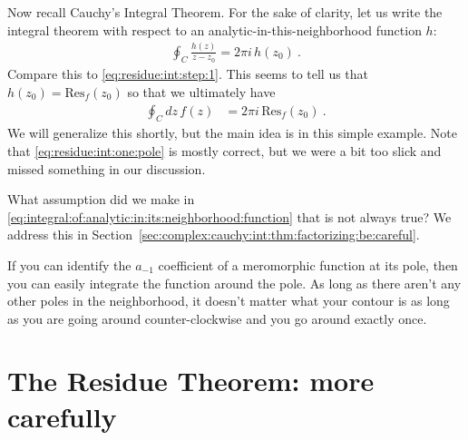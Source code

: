 Now recall Cauchy's Integral Theorem. For the sake of clarity, let us write the integral theorem with respect to an analytic-in-this-neighborhood function $h$:
\begin{align}
  \oint_C \frac{h(z)}{z-z_0} = {2\pi i} \, h(z_0) \ .
  \label{eq:integral:of:analytic:in:its:neighborhood:function}
\end{align}
Compare this to \eqref{eq:residue:int:step:1}. This seems to tell us that $h(z_0) = \text{Res}_f(z_0)$ so that we ultimately have
\begin{align}
  \oint_C dz\, f(z) &=  2\pi i  \, \text{Res}_f(z_0) \ .
  \label{eq:residue:int:one:pole}
\end{align}
We will generalize this shortly, but the main idea is in this simple example. Note that \eqref{eq:residue:int:one:pole} is mostly correct, but we were a bit too slick and missed something in our discussion.
\begin{exercise}
What assumption did we make in \eqref{eq:integral:of:analytic:in:its:neighborhood:function} that is not always true? We address this in Section~\ref{sec:complex:cauchy:int:thm:factorizing:be:careful}.
\end{exercise}
If you can identify the $a_{-1}$ coefficient of a meromorphic function at its pole, then you can easily integrate the function around the pole. As long as there aren't any other poles in the neighborhood, it doesn't matter what your contour is as long as you are going around counter-clockwise and you go around exactly once.


\section{The Residue Theorem: more carefully}

